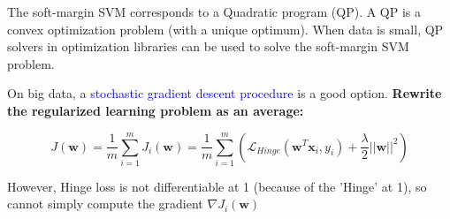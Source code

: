 \documentclass[12pt, a4paper]{article}
\begin{document}
\bigskip

The soft-margin SVM corresponds to a Quadratic program (QP). A QP is a convex optimization problem (with a unique optimum). When data is small, QP solvers in optimization libraries can be used to solve the soft-margin SVM problem.

\bigskip

On big data, a \textcolor{blue}{stochastic gradient descent procedure} is a good option. \textbf{Rewrite the regularized learning problem as an average:}

$$
J(\mathbf{w}) = \frac{1}{m} \sum_{i=1}^m J_i(\mathbf{w}) = \frac{1}{m} \sum_{i=1}^m (\mathcal{L}_{Hinge}(\mathbf{w}^T \mathbf{x}_i, y_i) + \frac{\lambda}{2}||\mathbf{w}||^2)
$$

However, Hinge loss is not differentiable at 1 (because of the ’Hinge’ at 1), so cannot simply compute the gradient $\nabla J_i (\mathbf{w})$
\end{document}
